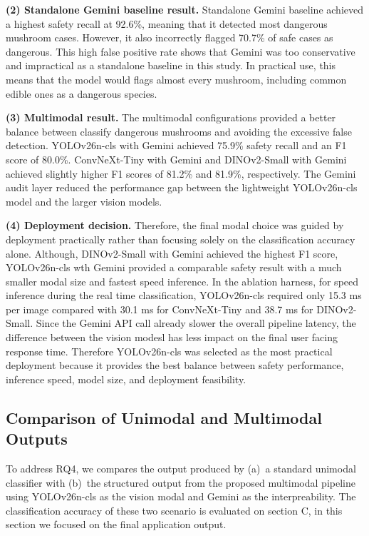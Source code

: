 \documentclass[journal,transmag]{IEEEtran}
\begin{document}
\textbf{(2) Standalone Gemini baseline result.} Standalone Gemini baseline achieved a highest safety recall at 92.6\%, meaning that it detected most dangerous mushroom cases. However, it also incorrectly flagged 70.7\% of safe cases as dangerous. This high false positive rate shows that Gemini was too conservative and impractical as a standalone baseline in this study. In practical use, this means that the model would flags almost every mushroom, including common edible ones as a dangerous species.


\textbf{(3) Multimodal result.}
The multimodal configurations provided a better balance between classify dangerous mushrooms and avoiding the excessive false detection. YOLOv26n-cls with Gemini achieved 75.9\% safety recall and an F1 score of 80.0\%. ConvNeXt-Tiny with Gemini and DINOv2-Small with Gemini achieved slightly higher F1 scores of 81.2\% and 81.9\%, respectively. The Gemini audit layer reduced the performance gap between the lightweight YOLOv26n-cls model and the larger vision models.

\textbf{(4) Deployment decision.}
Therefore, the final modal choice was guided by deployment practically rather than focusing solely on the classification accuracy alone. Although, DINOv2-Small with Gemini achieved the highest F1 score, YOLOv26n-cls wth Gemini provided a comparable safety result with a much smaller modal size and fastest speed inference. In the ablation harness, for speed inference during the real time classification, YOLOv26n-cls required only 15.3 ms per image compared with 30.1 ms for ConvNeXt-Tiny and 38.7 ms for DINOv2-Small. Since the Gemini API call already slower the overall pipeline latency, the difference between the vision modesl has less impact on the final user facing response time. Therefore YOLOv26n-cls was selected as the most practical deployment because it provides the best balance between safety performance, inference speed, model size, and deployment feasibility.



 
\subsection{\textbf{Comparison of Unimodal and  Multimodal Outputs}}

To address RQ4, we compares the output produced by (a)~a standard unimodal classifier with (b)~the structured output from the proposed multimodal pipeline using YOLOv26n-cls as the vision modal and Gemini as the interpreability. The classification accuracy of these two scenario is evaluated on section C, in this section we focused on the final application output. 
\end{document}

